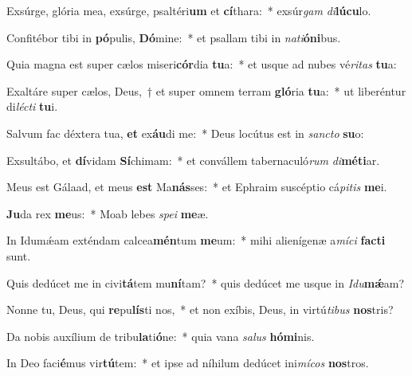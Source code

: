 \item Exsúrge, glória mea, exsúrge, psaltéri\textbf{um} et \textbf{cí}thara:~* exsúr\textit{gam} \textit{di}\textbf{lú}\textbf{cu}lo.
\item Confitébor tibi in \textbf{pó}pulis, \textbf{Dó}mine:~* et psallam tibi in \textit{na}\textit{ti}\textbf{ó}\textbf{ni}bus.
\item Quia magna est super cælos miseri\textbf{cór}dia \textbf{tu}a:~* et usque ad nubes vé\textit{ri}\textit{tas} \textbf{tu}a:
\item Exaltáre super cælos, Deus,~† et super omnem terram \textbf{gló}ria \textbf{tu}a:~* ut liberéntur di\textit{léc}\textit{ti} \textbf{tu}i.
\item Salvum fac déxtera tua, \textbf{et} ex\textbf{áu}di me:~* Deus locútus est in \textit{sanc}\textit{to} \textbf{su}o:
\item Exsultábo, et \textbf{dí}vidam \textbf{Sí}chimam:~* et convállem tabernaculó\textit{rum} \textit{di}\textbf{mé}\textbf{ti}ar.
\item Meus est Gálaad, et meus \textbf{est} Ma\textbf{nás}ses:~* et Ephraim suscéptio cá\textit{pi}\textit{tis} \textbf{me}i.
\item \textbf{Ju}da rex \textbf{me}us:~* Moab lebes \textit{spe}\textit{i} \textbf{me}æ.
\item In Idumǽam exténdam calcea\textbf{mén}tum \textbf{me}um:~* mihi alienígenæ a\textit{mí}\textit{ci} \textbf{fac}\textbf{ti} sunt.
\item Quis dedúcet me in civi\textbf{tá}tem mu\textbf{ní}tam?~* quis dedúcet me usque in \textit{I}\textit{du}\textbf{mǽ}am?
\item Nonne tu, Deus, qui \textbf{re}pu\textbf{lís}ti nos,~* et non exíbis, Deus, in virtú\textit{ti}\textit{bus} \textbf{nos}tris?
\item Da nobis auxílium de tribu\textbf{la}ti\textbf{ó}ne:~* quia vana \textit{sa}\textit{lus} \textbf{hó}\textbf{mi}nis.
\item In Deo faci\textbf{é}mus vir\textbf{tú}tem:~* et ipse ad níhilum dedúcet ini\textit{mí}\textit{cos} \textbf{nos}tros.
